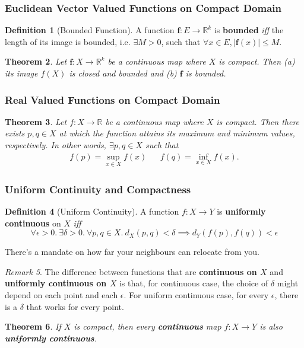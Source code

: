 \documentclass[a4paper,12pt]{report}
\newcommand{\R}{\mathbb{R}}
\newcommand{\bm}{\boldsymbol}
\newcommand{\tb}{\textbf}
\theoremstyle{plain}
\newtheorem{theorem}{\color{blue}Theorem}[chapter] %
\theoremstyle{definition}
\newtheorem{definition}[theorem]{\color{red}Definition} %
\theoremstyle{remark}
\newtheorem{remark}[theorem]{\color{ForestGreen}Remark} %
\begin{document}
\subsubsection{Euclidean Vector Valued Functions on Compact Domain}
\begin{definition}[Bounded Function]
A function $\mathbf{f}:E\to \R^k$ is \tb{bounded} \emph{iff} the length of its image is bounded, i.e. $\exists M>0$, such that $\forall x\in E, |\mathbf{f}(x)|\leq M$.
\end{definition}
\begin{theorem}
Let $\mathbf{f}:X\to \R^k$ be a continuous map where $X$ is compact. Then (a) its image $f(X)$ is closed and bounded and (b) $\bm{f}$ is bounded.
\end{theorem}
\subsubsection{Real Valued Functions on Compact Domain}
\begin{theorem}
Let $f:X\to\R$ be a continuous map where $X$ is compact. Then there exists $p,q\in X$ at which the function attains its maximum and minimum values, respectively. In other words, $\exists p,q\in X$ such that
\begin{align*}
f(p)=\sup_{x\in X}f(x) && f(q)=\inf_{x\in X}f(x).
\end{align*}
\end{theorem}
\subsubsection{Uniform Continuity and Compactness}
\begin{definition}[Uniform Continuity]
A function $f:X\to Y$ is \tb{uniformly continuous} on $X$ \emph{iff}
\[
\forall\epsilon>0.\:\exists\delta>0.\:\forall p,q\in X.\:d_X(p,q)<\delta\implies d_Y(f(p),f(q))<\epsilon
\]
\end{definition}
\begin{insight}
There's a mandate on how far your neighbours can relocate from you.
\end{insight}
\begin{remark}
The difference between functions that are \tb{continuous on $X$} and \tb{uniformly continuous on $X$} is that, for continuous case, the choice of $\delta$ might depend on each point and each $\epsilon$. For uniform continuous case, for every $\epsilon$, there is a $\delta$ that works for every point.
\end{remark}
\begin{theorem}
If $X$ is compact, then every \tb{continuous} map $f:X\to Y$ is also \tb{uniformly continuous}.
\end{theorem}
\end{document}
